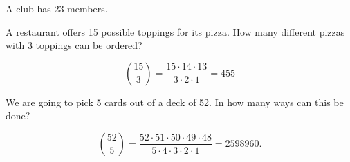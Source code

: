 \documentclass[11pt]{exam}
\begin{document}
\begin{questions}




\question A club has 23 members.  




\question A restaurant offers 15 possible toppings for its pizza.  How many
different pizzas with 3 toppings can be ordered?

\begin{solution}
\[
  \binom{15}{3} = \frac{15 \cdot 14 \cdot 13}{3 \cdot 2 \cdot 1} = 455
\]
\end{solution}



\question We are going to pick 5 cards out of a deck of 52.  In how many ways
can this be done?

\begin{solution}
\[
  \binom{52}{5}
  = \frac{52 \cdot 51 \cdot 50 \cdot 49 \cdot 48}{5 \cdot 4 \cdot 3 \cdot 2 \cdot 1}
  = 2598960.
\]
\end{solution}



\end{questions}
\end{document}
